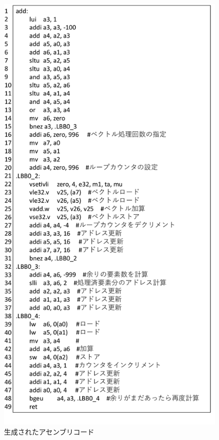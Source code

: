 \begin{figure}
    \centering
    \includegraphics[scale=0.55]{image/rv_vectorized_assembly.pdf}
    \caption{生成されたアセンブリコード}
    \label{fig:rv_vectorized_assembly}
\end{figure}

